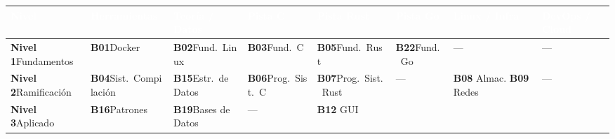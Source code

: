 \documentclass[11pt, letterpaper]{article}
\begin{document}
\begin{table}[H]
\centering
\small
\begin{tabular}{
  >{\centering\arraybackslash}m{1.8cm}|
  >{\centering\arraybackslash}m{2.4cm}|
  >{\centering\arraybackslash}m{2.4cm}|
  >{\centering\arraybackslash}m{2.4cm}|
  >{\centering\arraybackslash}m{2.4cm}|
  >{\centering\arraybackslash}m{2.4cm}|
  >{\centering\arraybackslash}m{2.4cm}|
  >{\centering\arraybackslash}m{2.4cm}}
\toprule
\rowcolor{rowhead}
\textcolor{white}{\textbf{Nivel}}
  & \textcolor{white}{\textbf{Herramientas}}
  & \textcolor{white}{\textbf{Teoría / Datos}}
  & \textcolor{white}{\textbf{Pista C}}
  & \textcolor{white}{\textbf{Pista Rust}}
  & \textcolor{white}{\textbf{Pista Go}}
  & \textcolor{white}{\textbf{Linux / Infra}}
  & \textcolor{white}{\textbf{DevOps / Cloud}} \\
\midrule
\cellcolor{tTrack}\textbf{Nivel 1}\newline Fundamentos
  & \cellcolor{tTrack}\textbf{B01}\newline Docker
  & \cellcolor{tTrack}\textbf{B02}\newline Fund.\ Linux
  & \cellcolor{cTrack}\textbf{B03}\newline Fund.\ C
  & \cellcolor{rTrack}\textbf{B05}\newline Fund.\ Rust
  & \cellcolor{goTrack}\textbf{B22}\newline Fund.\ Go
  & ---
  & --- \\
\hline
\cellcolor{qTrack}\textbf{Nivel 2}\newline Ramificación
  & \cellcolor{qTrack}\textbf{B04}\newline Sist.\ Compilación
  & \cellcolor{tTrack}\textbf{B15}\newline Estr.\ de Datos
  & \cellcolor{cTrack}\textbf{B06}\newline Prog.\ Sist.\ C
  & \cellcolor{rTrack}\textbf{B07}\newline Prog.\ Sist.\ Rust
  & ---
  & \cellcolor{lTrack}\textbf{B08} Almac.\newline
    \textbf{B09} Redes
  & --- \\
\hline
\cellcolor{qTrack}\textbf{Nivel 3}\newline Aplicado
  & \cellcolor{qTrack}\textbf{B16}\newline Patrones
  & \cellcolor{dTrack}\textbf{B19}\newline Bases de Datos
  & ---
  & \cellcolor{rTrack}\textbf{B12} GUI\newline

\end{tabular}
\end{table}
\end{document}
